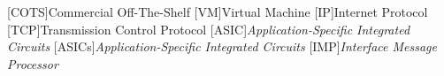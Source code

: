 [COTS]{Commercial Off-The-Shelf}
[VM]{Virtual Machine}
[IP]{Internet Protocol}
[TCP]{Transmission Control Protocol}
[ASIC]{\textit{Application-Specific Integrated Circuits}}
[ASICs]{\textit{Application-Specific Integrated Circuits}}
[IMP]{\textit{Interface Message Processor}}
